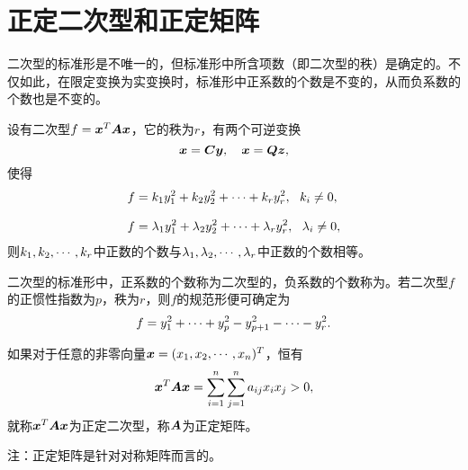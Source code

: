 \section{正定二次型和正定矩阵}

\begin{frame}
  二次型的标准形是不唯一的，但标准形中所含项数（即二次型的秩）是确定的。不仅如此，在限定变换为实变换时，标准形中正系数的个数是不变的，从而负系数的个数也是不变的。
\end{frame}

\begin{frame}
  \begin{dingli}[惯性定理]
    设有二次型$f={\boldsymbol{x}}^T\boldsymbol{A}{\boldsymbol{x}}$，它的秩为$r$，有两个可逆变换
    $$
    {\boldsymbol{x}} = \boldsymbol{C}{\boldsymbol{y}}, \quad {\boldsymbol{x}} = \boldsymbol{Q} {\boldsymbol{z}},
    $$
    使得
    $$
    \begin{aligned}
      f & = k_1y_1^2+k_2y_2^2+\cdots+k_ry_r^2, ~~ k_i\ne 0, \\[0.1in]
      f & = \lambda_1y_1^2+\lambda_2y_2^2+\cdots+\lambda_ry_r^2, ~~ \lambda_i\ne 0,
    \end{aligned}
    $$
    则$k_1,k_2,\cdots,k_r$中正数的个数与$\lambda_1,\lambda_2,\cdots,\lambda_r$中正数的个数相等。
  \end{dingli}
\end{frame}

\begin{frame}
  二次型的标准形中，正系数的个数称为二次型的，负系数的个数称为。若二次型$f$的正惯性指数为$p$，秩为$r$，则$f$的规范形便可确定为
  $$
  f=y_1^2+\cdots+y_p^2-y_{p+1}^2-\cdots-y_r^2.
  $$
\end{frame}

\begin{frame}
  
    \begin{dingyi}
      如果对于任意的非零向量${\boldsymbol{x}}=(x_1,x_2,\cdots,x_n)^T$，恒有
      $$
      {\boldsymbol{x}}^T\boldsymbol{A}{\boldsymbol{x}}=\sum_{i=1}^n\sum_{j=1}^na_{ij}x_ix_j>0,
      $$
      就称${\boldsymbol{x}}^T\boldsymbol{A}{\boldsymbol{x}}$为正定二次型，称$\boldsymbol{A}$为正定矩阵。
    \end{dingyi}
    \pause\vspace{0.1in}

    
    注：正定矩阵是针对对称矩阵而言的。
    
  
\end{frame}

